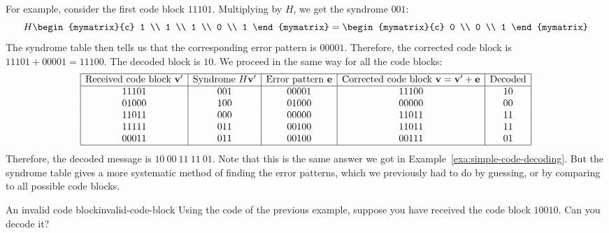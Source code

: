 \begin{solution}
  For example, consider the first code block $11101$. Multiplying by
  $H$, we get the syndrome $001$:
  \begin{equation*}
    H \begin{mymatrix}{c} 1 \\ 1 \\ 1 \\ 0 \\ 1 \end{mymatrix}
    = \begin{mymatrix}{c} 0 \\ 0 \\ 1 \end{mymatrix}
  \end{equation*}
  The syndrome table then tells us that the corresponding error pattern
  is $00001$. Therefore, the corrected code block is $11101 + 00001 =
  11100$. The decoded block is $10$. We proceed in the same way for
  all the code blocks:
  \begin{equation*}
    \begin{array}{|c|c|c|c|c|}
      \hline
      \mbox{Received code block $\vect{v}'$} &
      \mbox{Syndrome $H\vect{v}'$} &
      \mbox{Error pattern $\vect{e}$} &
      \mbox{Corrected code block $\vect{v}=\vect{v}'+\vect{e}$} &
      \mbox{Decoded} \\
      \hline
      11101 & 001 & 00001 & 11100 & 10 \\
      01000 & 100 & 01000 & 00000 & 00 \\
      11011 & 000 & 00000 & 11011 & 11 \\
      11111 & 011 & 00100 & 11011 & 11 \\
      00011 & 011 & 00100 & 00111 & 01 \\
      \hline
    \end{array}
  \end{equation*}
  Therefore, the decoded message is $10~00~11~11~01$. Note that this
  is the same answer we got in Example~\ref{exa:simple-code-decoding}.
  But the syndrome table gives a more systematic method of finding the
  error patterns, which we previously had to do by guessing, or by
  comparing to all possible code blocks.
\end{solution}

\begin{example}{An invalid code block}{invalid-code-block}
  Using the code of the previous example, suppose you have received
  the code block $10010$. Can you decode it?
\end{example}


